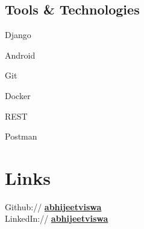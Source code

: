 \documentclass[]{abhijeet_viswa-deedy-resume-openfont}
\begin{document}
\begin{minipage}[t]{0.25\textwidth}
\subsection{Tools \& Technologies}
\begin{itemize*}
 \item Django
 \item Android
 \item Git
 \item Docker
 \item REST
 \item Postman
\end{itemize*}

\sectionsep



\section{Links}
Github:// \mbox{\href{https://github.com/abhijeetviswa}{\bf abhijeetviswa}}\\[3pt]
LinkedIn://  \mbox{\href{https://www.linkedin.com/in/abhijeet-viswa-191486135/}{\bf abhijeetviswa}} \\
%
%

\end{minipage}
\hfill
\end{document}
